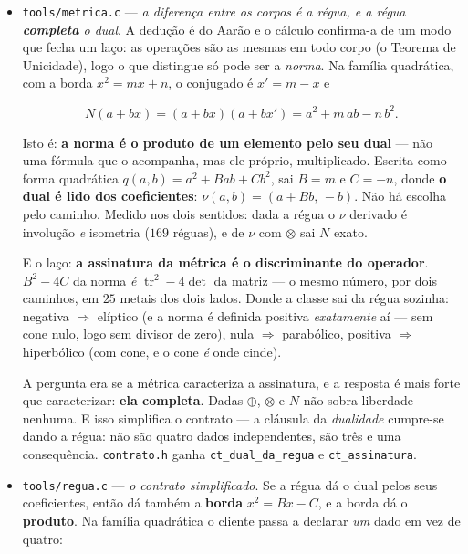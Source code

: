 \documentclass[11pt]{article}
\newcommand{\code}[1]{\texttt{\small #1}}
\theoremstyle{plain}
\theoremstyle{remark}
\newcommand{\tr}{\operatorname{tr}}
\begin{document}
\begin{itemize}
E o que \textbf{não} se validou, dito na primeira linha da saída: \emph{o modelo finito de cada
um é anterior}. O catálogo dá a tríade, mas a régua da maioria é contínua, e $M_4$/$A_4$ precisam de
domínio finito --- logo escolhi um modelo por corpo (o específico onde o catálogo diz algo
concreto, o genérico da forma onde não diz). Validou-se a \emph{álgebra da forma}, não a régua
própria; a dissipação do motor, por exemplo, é propriedade da régua e \textbf{nenhuma} das doze
cláusulas a alcança --- por isso ele cumpre aqui. Dizer que validei os $28$ completos seria medir
a fatia e afirmar o todo.
\item \code{tools/metrica.c} --- \emph{a diferença entre os corpos é a régua, e a régua
\textbf{completa} o dual}. A dedução é do Aarão e o cálculo confirma-a de um modo que fecha um
laço: as operações são as mesmas em todo corpo (o Teorema de Unicidade), logo o que distingue só
pode ser a \emph{norma}. Na família quadrática, com a borda $x^2 = mx + n$, o conjugado é
$x' = m-x$ e

\[ N(a+bx) = (a+bx)(a+bx') = a^2 + m\,ab - n\,b^2. \]

Isto é: \textbf{a norma é o produto de um elemento pelo seu dual} --- não uma fórmula que o
acompanha, mas ele próprio, multiplicado. Escrita como forma quadrática $q(a,b) = a^2 + Bab + Cb^2$,
sai $B = m$ e $C = -n$, donde \textbf{o dual é lido dos coeficientes}: $\nu(a,b) = (a+Bb,\,-b)$.
Não há escolha pelo caminho. Medido nos dois sentidos: dada a régua o $\nu$ derivado é involução
\emph{e} isometria ($169$ réguas), e de $\nu$ com $\otimes$ sai $N$ exato.

E o laço: \textbf{a assinatura da métrica é o discriminante do operador}. $B^2-4C$ da norma
\emph{é} $\tr^2 - 4\det$ da matriz --- o mesmo número, por dois caminhos, em $25$ metais dos dois
lados. Donde a classe sai da régua sozinha: negativa $\Rightarrow$ elíptico (e a norma é definida
positiva \emph{exatamente} aí --- sem cone nulo, logo sem divisor de zero), nula $\Rightarrow$
parabólico, positiva $\Rightarrow$ hiperbólico (com cone, e o cone \emph{é} onde cinde).

A pergunta era se a métrica caracteriza a assinatura, e a resposta é mais forte que caracterizar:
\textbf{ela completa}. Dadas $\oplus$, $\otimes$ e $N$ não sobra liberdade nenhuma. E isso
simplifica o contrato --- a cláusula da \emph{dualidade} cumpre-se dando a régua: não são quatro
dados independentes, são três e uma consequência. \code{contrato.h} ganha
\code{ct\_dual\_da\_regua} e \code{ct\_assinatura}.
\item \code{tools/regua.c} --- \emph{o contrato simplificado}. Se a régua dá o dual pelos seus
coeficientes, então dá também a \textbf{borda} $x^2 = Bx - C$, e a borda dá o \textbf{produto}.
Na família quadrática o cliente passa a declarar \emph{um} dado em vez de quatro:


\end{itemize}
\end{document}
